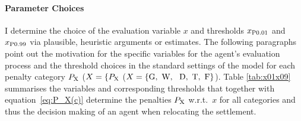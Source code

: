 
\paragraph{Parameter Choices} %
I determine the choice of the evaluation variable $x$ and thresholds $x_{\rm P0.01}$ and $x_{\rm P0.99}$ via plausible, heuristic arguments or estimates.
The following paragraphs point out the motivation for the specific variables for the agent's evaluation process and the threshold choices in the standard settings of the model for each penalty category $P_{\rm X}$ ($X=\{P_{\rm X}$ ($X=\{\text{G,\, W, \, D,\, T,\, F}\}$).
Table \ref{tab:x01x09} summarises the variables and corresponding thresholds that together with equation~\ref{eq:P_X(c)} determine the penalties $P_{\rm X}$ w.r.t.\ $x$ for all categories and thus the decision making of an agent when relocating the settlement.



